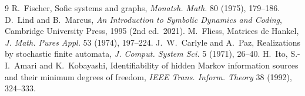 \documentclass[11pt]{article}
\theoremstyle{definition}
\theoremstyle{remark}
\begin{document}
\begin{thebibliography}{9}
 R.~Fischer, Sofic systems and graphs, \emph{Monatsh. Math.}
80 (1975), 179--186.
 D.~Lind and B.~Marcus, \emph{An Introduction to Symbolic Dynamics
and Coding}, Cambridge University Press, 1995 (2nd ed.\ 2021).
 M.~Fliess, Matrices de Hankel, \emph{J. Math. Pures Appl.}
53 (1974), 197--224.
 J.~W.~Carlyle and A.~Paz, Realizations by stochastic finite
automata, \emph{J. Comput. System Sci.} 5 (1971), 26--40.
 H.~Ito, S.-I.~Amari and K.~Kobayashi, Identifiability of hidden
Markov information sources and their minimum degrees of freedom,
\emph{IEEE Trans. Inform. Theory} 38 (1992), 324--333.
\end{thebibliography}
\end{document}
